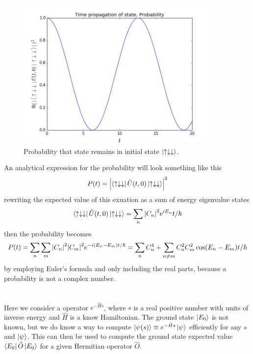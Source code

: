 \documentclass{article}
\begin{document}
\begin{figure}
	\centering
	\includegraphics[width=0.9\textwidth]{figures/probability.png}
	\caption{Probability that state remains in initial state $\ket{\uparrow\downarrow\downarrow}$.}
	\label{fig:probability}
\end{figure}

An analytical expression for the probability will look something like this
\begin{equation*}
P(t) = \abs{\bra{\uparrow\downarrow\downarrow}\hat{U}(t,0)\ket{\uparrow\downarrow\downarrow}}^2
\end{equation*}
rewriting the expected value of this exuation as a sum of energy eigenvalue states
\begin{equation*}
\bra{\uparrow\downarrow\downarrow}\hat{U}(t,0)\ket{\uparrow\downarrow\downarrow} =
\sum_n \abs{C_n}^2e^{iE_n}t/\hbar
\end{equation*}
then the probability becomes
\begin{equation}
P(t) = \sum_n\sum_m\abs{C_n}^2\abs{C_m}^2e^{-i(E_n-E_m)t/\hbar}=\sum_nC_n^4+\sum_{n\neq m}C_n^2C_m^2\cos(E_n-E_m)t/\hbar
\end{equation}
by employing Euler's formula and only including the real parts, because a probability is not a complex number.

\section{}
Here we consider a operator $e^{-\hat{H}s}$, where $s$ is a real positive number with units of inverse energy and $\hat{H}$ is a know Hamiltonian. The ground state $\ket{E_0}$ is not known, but we do know a way to compute $\ket{\psi(s)}\equiv e^{-\hat{H}s}\ket{\psi}$ efficiently for any $s$ and $\ket{\psi}$. This can then be used to compute the ground state expected value  $\bra{E_0}\hat{O}\ket{E_0}$ for a given Hermitian operator $\hat{O}$.
\end{document}
